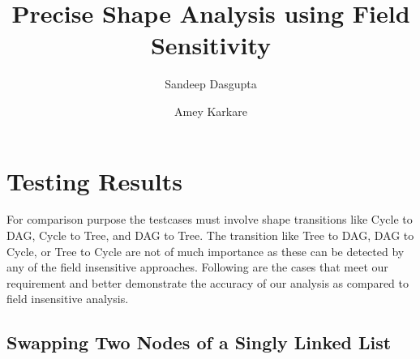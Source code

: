 \documentclass[runningheads,a4paper]{llncs}
\begin{document}
\mainmatter  %

\title{Precise Shape Analysis using Field Sensitivity}


%
%
\author{Sandeep Dasgupta \and Amey Karkare}
%



\maketitle

\section{Testing Results}

For comparison purpose the testcases must 
involve shape transitions like Cycle to DAG, Cycle to Tree, and DAG to Tree. The
transition like Tree to DAG, DAG to Cycle, or Tree to Cycle are not of much importance as 
these can be detected by any of the field insensitive approaches. Following are the cases that 
meet our requirement and better demonstrate the accuracy of our analysis
as compared to field insensitive analysis.

\subsection{Swapping Two Nodes of a Singly Linked List}
\end{document}
